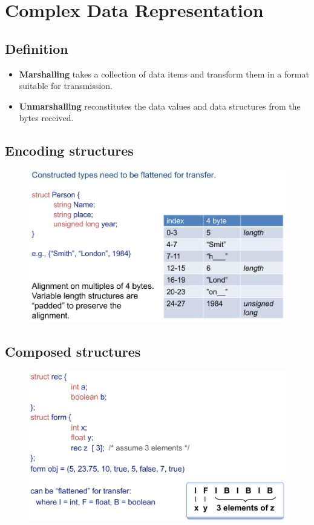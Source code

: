 \documentclass[twocolumn,landscape,10pt]{article}
\theoremstyle{definition}
\begin{document}
\section{Complex Data Representation}

\subsection{Definition}

\begin{itemize}
    \item \textbf{Marshalling} takes a collection of data items and transform
        them in a format suitable for transmission.
    \item \textbf{Unmarshalling} reconstitutes the data values and data
        structures from the bytes received.
\end{itemize} 

\subsection{Encoding structures}

\begin{figure}[h]
  	\includegraphics[scale=0.35]{encode_struct.png}
  	\centering
\end{figure}

\subsection{Composed structures}

\begin{figure}[h]
  	\includegraphics[scale=0.30]{composed_struct.png}
  	\centering
\end{figure}
\end{document}
